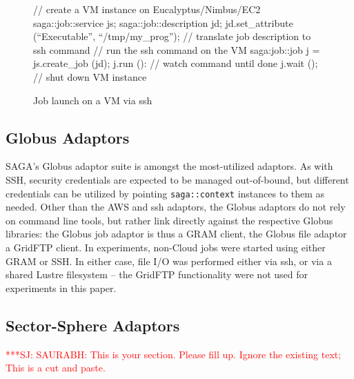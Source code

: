 \documentclass[conference,final]{IEEEtran}
\newcommand{\jhanote}[1]{ {\textcolor{red} { ***SJ: #1 }}}
\newcommand{\jhanote}[1]{}
\newcommand{\upup}{\vspace*{-0.6em}}
\newcommand{\upp}{\vspace*{-0.6em}}
\newcommand{\T}[1]{\texttt{#1}}
\begin{document}
\begin{figure}[!ht]
\upp
 \begin{center}
  \begin{mycode}[label=SAGA create a VM instance on a Cloud]
   {// create a VM instance on Eucalyptus/Nimbus/EC2
    saga::job::service     js;
    saga::job::description jd;
    jd.set_attribute (``Executable'', ``/tmp/my_prog'');
    // translate job description to ssh command
    // run the ssh command on the VM
    saga:job::job j = js.create_job (jd);
    j.run ():
    // watch command until done
    j.wait ();
   } // shut down VM instance
  \end{mycode}
  \caption{\label{vmjob} Job launch on a VM via ssh\vspace*{-2em}}
 \end{center}
\upp
\end{figure}

\upup
\upup
\subsection{Globus Adaptors}
SAGA's Globus adaptor suite is amongst the most-utilized adaptors.  As
with SSH, security credentials are expected to be managed
out-of-bound, but different credentials can be utilized by pointing
\T{saga::context} instances to them as needed.  Other than the AWS and
ssh adaptors, the Globus adaptors do not rely on command line tools,
but rather link directly against the respective Globus libraries: the
Globus job adaptor is thus a GRAM client, the Globus file adaptor a
GridFTP client.  In experiments, non-Cloud jobs were started using
either GRAM or SSH.  In either case, file I/O was performed either via
ssh, or via a shared Lustre filesystem -- the GridFTP functionality
were not used for experiments in this paper.

\subsection{Sector-Sphere Adaptors}

\jhanote{SAURABH: This is your section. Please fill up. Ignore the
  existing text; This is a cut and paste. }
\end{document}

